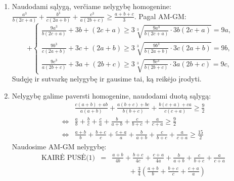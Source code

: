 \begin{enumerate}
$$\begin{array}{ll}
    1+\frac{2c}{3d}=\frac{1}{3}+\frac{1}{3}+\frac{1}{3}+\frac{c}{3d}+\frac{c}{3d}\geq5\sqrt[5]{\left(\frac{1}{3}\right)^3\cdot\left(\frac{c}{3d}\right)^2}=\frac{5}{3}\left(\frac{c}{d}\right)^{\frac{2}{5}},&\\
    1+\frac{2d}{3a}=\frac{1}{3}+\frac{1}{3}+\frac{1}{3}+\frac{d}{3a}+\frac{d}{3a}\geq5\sqrt[5]{\left(\frac{1}{3}\right)^3\cdot\left(\frac{d}{3a}\right)^2}=\frac{5}{3}\left(\frac{d}{a}\right)^{\frac{2}{5}},&
    \end{array}\right.$$ $\Rightarrow
    S=\left(1+\frac{2a}{3b}\right)\left(1+\frac{2b}{3c}\right)\left(1+\frac{2c}{3d}\right)\left(1+\frac{2d}{3a}\right)\geq\frac{625}{81}\cdot\left(\frac{a}{b}\cdot\frac{b}{c}\cdot\frac{c}{d}\cdot\frac{d}{a}\right)^{\frac{2}{5}}=\frac{625}{81}.$
    $S$ Minimumas yra $\frac{625}{81}$. Jis pasiekiamas, kai $a=b=c=d>0.$
\item
    Naudodami sąlygą, verčiame nelygybę homogenine:
    $\frac{a^3}{b(2c+a)}+\frac{b^3}{c(2a+b)}+\frac{c^3}{a(2b+c)}\geq
    \frac{a+b+c}{3}.$ Pagal AM-GM: $$+\left\{\begin{array}{ll}
    \frac{9a^3}{b(2c+a)}+3b+(2c+a)\geq3\sqrt[3]{\frac{9a^3}{b(2c+a)}\cdot3b(2c+a)}=9a,&\\
    \frac{9b^3}{c(2a+b)}+3c+(2a+b)\geq3\sqrt[3]{\frac{9b^3}{b(2a+b)}\cdot3c(2a+b)}=9b,&\\
    \frac{9c^3}{a(2b+c)}+3a+(2b+c)\geq3\sqrt[3]{\frac{9c^3}{b(2b+c)}\cdot3a(2b+c)}=9c,&
    \end{array}\right.$$ Sudęję ir sutvarkę nelygybę ir gausime tai, ką
    reikėjo įrodyti.
\item
    Nelygybę galime paversti homogenine, naudodami duotą sąlygą:
    \begin{align*}
    &\frac{c(a+b)+ab}{a(a+b)}+\frac{a(b+c)+bc}{b(b+c)}+\frac{b(c+a)+ca}{c(c+a)}\geq\frac{9}{2}\\
    \Leftrightarrow&\frac{a}{b}+\frac{b}{c}+\frac{c}{a}+\frac{b}{a+b}+\frac{c}{b+c}+\frac{a}{c+a}\geq\frac{9}{2}\\
    \Leftrightarrow&\frac{a+b}{b}+\frac{b+c}{c}+\frac{c+a}{a}+\frac{b}{a+b}+\frac{c}{b+c}+\frac{a}{c+a}\geq\frac{15}{2}
    \tag{1} \end{align*} Naudosime AM-GM nelygybę:
    \begin{eqnarray*}\mbox{KAIRĖ PUSĖ(1)}
    &=&\frac{a+b}{4b}+\frac{b+c}{4c}+\frac{c+a}{4a}+\frac{b}{a+b}+\frac{c}{b+c}+\frac{a}{c+a}\\
    &&\hspace{1cm}+\frac{3}{4}\left(\frac{a+b}{b}+\frac{b+c}{c}+\frac{c+a}{a}\right)\\

\end{eqnarray*}
\end{enumerate}
